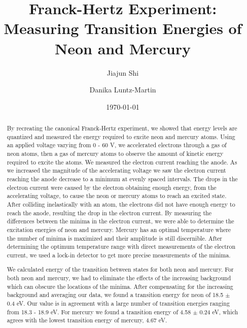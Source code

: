 \documentclass[prb,preprint]{revtex4-1}
\begin{document}
\title{Franck-Hertz Experiment: Measuring Transition Energies of Neon and Mercury}

\author{Jiajun Shi}


\author{Danika Luntz-Martin}


\date{\today}

\begin{abstract}

By recreating the canonical Franck-Hertz experiment, we showed that energy levels are quantized and measured the energy required to excite neon and mercury atoms. Using an applied voltage varying from 0 - 60 V, we accelerated electrons through a gas of neon atoms, then a gas of mercury atoms to observe the amount of kinetic energy required to excite the atoms. We measured the electron current reaching the anode. As we increased the magnitude of the accelerating voltage we saw the electron current reaching the anode decrease to a minimum at evenly spaced intervals. The drops in the electron current were caused by the electron obtaining enough energy, from the accelerating voltage, to cause the neon or mercury atoms to reach an excited state. After colliding inelastically with an atom, the electrons did not have enough energy to reach the anode, resulting the drop in the electron current. By measuring the differences between the minima in the electron current, we were able to determine the excitation energies of neon and mercury. Mercury has an optimal temperature where the number of minima is maximized and their amplitude is still discernible. After determining the optimum temperature range with direct measurements of the electron current, we used a lock-in detector to get more precise measurements of the minima.

We calculated energy of the transition between states for both neon and mercury. For both neon and mercury, we had to eliminate the effects of the increasing background which can obscure the locations of the minima. After compensating for the increasing background and averaging our data, we found a transition energy for neon of 18.5 $\pm$ 0.4 eV. Our value is in agreement with a large number of transition energies ranging from 18.3 - 18.9 eV. For mercury we found a transition energy of 4.58 $\pm$ 0.24 eV, which agrees with the lowest transition energy of mercury, 4.67 eV.

\end{abstract}
\end{document}
